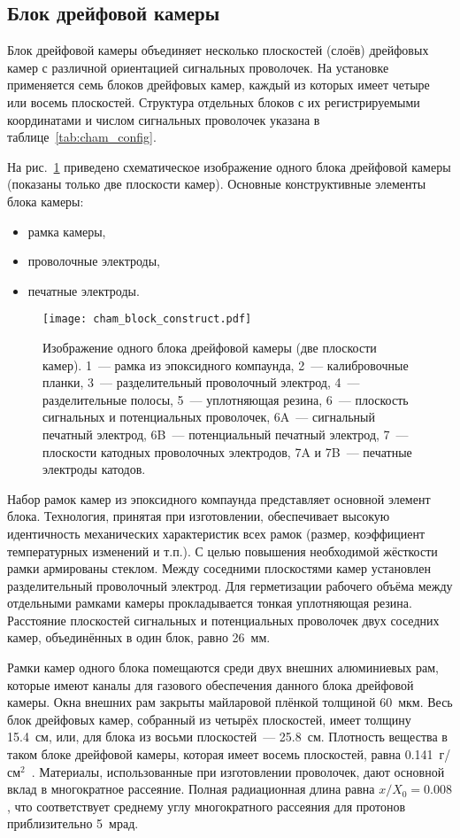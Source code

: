 \subsection{Блок дрейфовой камеры}
Блок дрейфовой камеры объединяет несколько плоскостей (слоёв) дрейфовых камер с
различной ориентацией сигнальных проволочек. На установке применяется семь
блоков дрейфовых камер, каждый из которых имеет четыре или восемь плоскостей.
Структура отдельных блоков с их регистрируемыми координатами и числом сигнальных
проволочек указана в таблице~\ref{tab:cham_config}.

На рис.~\ref{fig:cham_block_construct} приведено схематическое изображение
одного блока дрейфовой камеры (показаны только две плоскости камер). Основные
конструктивные элементы блока камеры:
\begin{itemize}
\item рамка камеры,
\item проволочные электроды,
\item печатные электроды.
\end{itemize}

\begin{figure}[h]
  \centering
  \texttt{[image: cham\_block\_construct.pdf]}
  \caption{Изображение одного блока дрейфовой камеры (две плоскости камер).
    1~--- рамка из эпоксидного компаунда, 2~--- калибровочные планки, 3~---
    разделительный проволочный электрод, 4~--- разделительные полосы, 5~---
    уплотняющая резина, 6~--- плоскость сигнальных и потенциальных проволочек,
    6A~--- сигнальный печатный электрод, 6B~--- потенциальный печатный
    электрод, 7~--- плоскости катодных проволочных электродов, 7A и 7B~---
    печатные электроды катодов.}
  \label{fig:cham_block_construct}
\end{figure}

Набор рамок камер из эпоксидного компаунда представляет основной элемент
блока. Технология, принятая при изготовлении, обеспечивает высокую идентичность
механических характеристик всех рамок (размер, коэффициент температурных
изменений и т.п.). С целью повышения необходимой жёсткости рамки армированы
стеклом. Между соседними плоскостями камер установлен разделительный проволочный
электрод. Для герметизации рабочего объёма между отдельными рамками камеры
прокладывается тонкая уплотняющая резина. Расстояние плоскостей сигнальных и
потенциальных проволочек двух соседних камер, объединённых в один блок, равно
26~мм.

Рамки камер одного блока помещаются среди двух внешних алюминиевых рам, которые
имеют каналы для газового обеспечения данного блока дрейфовой камеры. Окна
внешних рам закрыты майларовой плёнкой толщиной 60~мкм. Весь блок дрейфовых
камер, собранный из четырёх плоскостей, имеет толщину 15.4~см, или, для блока из
восьми плоскостей~--- 25.8~см. Плотность вещества в таком блоке дрейфовой
камеры, которая имеет восемь плоскостей, равна 0.141~г/см$^2$~\cite{filatova77}.
Материалы, использованные при изготовлении проволочек, дают основной вклад в
многократное рассеяние. Полная радиационная длина равна $x/X_0 = 0.008$, что
соответствует среднему углу многократного рассеяния для протонов приблизительно
5~мрад.

